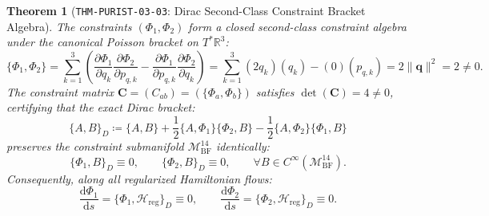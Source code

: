 \documentclass[11pt,a4paper,reqno]{article}
\theoremstyle{plain}
\newtheorem{theorem}{Theorem}[section]
\theoremstyle{definition}
\theoremstyle{remark}
\numberwithin{equation}{section}
\providecommand{\diff}{\mathrm{d}}
\begin{document}
\begin{theorem}[\texttt{THM-PURIST-03-03}: Dirac Second-Class Constraint Bracket Algebra]
\label{thm:dirac_algebra}
The constraints $(\Phi_1, \Phi_2)$ form a closed second-class constraint algebra under the canonical Poisson bracket on $T^* \mathbb{R}^3$:
\begin{equation}
\label{eq:poisson_bracket_proof}
\{\Phi_1, \Phi_2\} = \sum_{k=1}^3 \left( \frac{\partial \Phi_1}{\partial q_k} \frac{\partial \Phi_2}{\partial p_{q,k}} - \frac{\partial \Phi_1}{\partial p_{q,k}} \frac{\partial \Phi_2}{\partial q_k} \right) = \sum_{k=1}^3 (2 q_k)(q_k) - (0)(p_{q,k}) = 2 \|\mathbf{q}\|^2 = 2 \neq 0.
\end{equation}
The constraint matrix $\mathbf{C} = (C_{ab}) = (\{\Phi_a, \Phi_b\})$ satisfies $\det(\mathbf{C}) = 4 \neq 0$, certifying that the exact Dirac bracket:
\begin{equation}
\label{eq:dirac_bracket}
\{A, B\}_D \coloneqq \{A, B\} + \frac{1}{2} \{A, \Phi_1\} \{\Phi_2, B\} - \frac{1}{2} \{A, \Phi_2\} \{\Phi_1, B\}
\end{equation}
preserves the constraint submanifold $\mathcal{M}_{\mathrm{BF}}^{14}$ identically:
\begin{equation}
  \{\Phi_1, B\}_D \equiv 0, \qquad \{\Phi_2, B\}_D \equiv 0, \qquad \forall B \in C^\infty(\mathcal{M}_{\mathrm{BF}}^{14}).
\end{equation}
Consequently, along all regularized Hamiltonian flows:
\begin{equation}
  \frac{\diff\Phi_1}{\diff s} = \{\Phi_1, \mathcal{H}_{\mathrm{reg}}\}_D \equiv 0, \qquad \frac{\diff\Phi_2}{\diff s} = \{\Phi_2, \mathcal{H}_{\mathrm{reg}}\}_D \equiv 0.
\end{equation}
\end{theorem}
\end{document}
